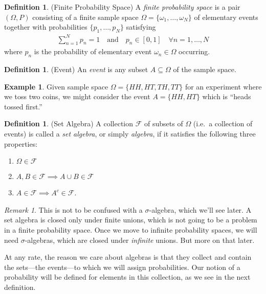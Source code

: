 \documentclass[12pt]{article}
\theoremstyle{plain}
\theoremstyle{definition}
\newtheorem{defn}[thm]{Definition}
\newtheorem{ex}[thm]{Example}
\theoremstyle{remark}
\newtheorem*{rmk}{Remark}
\newcommand{\sF}{\mathscr{F}}
\newcommand{\sumnN}{\sum^N_{n=1}}
\begin{document}
\begin{defn}{(Finite Probability Space)}
A \emph{finite probability space} is a pair $(\Omega,P)$ consisting of a
finite sample space $\Omega=\{\omega_1,\ldots,\omega_N\}$ of elementary
events together with probabilities $\{p_1,\ldots,p_N\}$ satisfying
\begin{align*}
  \sumnN p_n = 1
  \quad\text{and}\quad
  p_n \in [0,1] \quad \forall n=1,\ldots,N
\end{align*}
where $p_n$ is the probability of elementary event $\omega_n\in\Omega$
occurring.
\end{defn}

\begin{defn}{(Event)}
An \emph{event} is any subset $A\subseteq \Omega$ of the sample space.
\end{defn}
\begin{ex}
Given sample space $\Omega=\{HH,HT,TH,TT\}$ for an experiment where we
toss two coins, we might consider the event $A=\{HH,HT\}$ which is
``heads tossed first.''
\end{ex}


\begin{defn}{(Set Algebra)}
A collection $\sF$ of subsets of $\Omega$ (i.e.\ a collection of
events) is called a \emph{set algebra}, or simply \emph{algebra}, if it
satisfies the following three properties:
\begin{enumerate}
  \item $\Omega\in\sF$
  \item $A,B\in\sF \implies A\cup B\in\sF$
  \item $A\in\sF\implies A^c\in\sF$.
\end{enumerate}
\end{defn}
\begin{rmk}
This is not to be confused with a $\sigma$-algebra, which we'll see
later. A set algebra is closed only under finite unions, which is not
going to be a problem in a finite probability space. Once we move to
infinite probability spaces, we will need $\sigma$-algebras, which are
closed under \emph{infinite} unions. But more on that later.

At any rate, the reason we care about algebras is that they collect and
contain the sets---the events---to which we will assign probabilities.
Our notion of a probability will be defined for elements in this
collection, as we see in the next definition.
\end{rmk}
\end{document}
